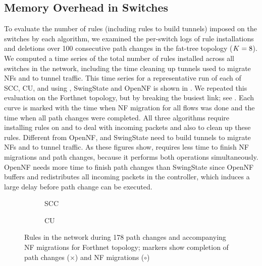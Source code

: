 \subsection{Memory Overhead in Switches}


To evaluate the number of rules (including rules to build tunnels)
imposed on the switches by each algorithm, we examined the per-switch
logs of rule installations and deletions over 100 consecutive path
changes in the fat-tree topology ($K = 8$). We computed
a time series of the total number of rules installed across all
switches in the network, including the time cleaning up tunnels used
to migrate NFs and to tunnel traffic. This time series for a
representative run of each of SCC, CU, and \ourRouteUpdateName using
\sysname, SwingState and OpenNF is shown in
.  We repeated this evaluation on the
Forthnet topology, but by breaking the busiest link; see
.  Each curve is marked with the time
when NF migration for all flows was done and the time when all path
changes were completed.  All three algorithms require installing rules
on \oldSwitchID{\nfIdx} and \newSwitchID{\nfIdx} to deal with incoming
packets and also to clean up these rules.  Different from OpenNF,
\sysname and SwingState need to build tunnels to migrate NFs and to
tunnel traffic.  As these figures show, \sysname requires less time to
finish NF migrations and path changes, because it performs both
operations simultaneously. OpenNF needs more time to finish path changes
than SwingState since OpenNF buffers and redistributes all incoming packets in the controller,
which induces a large delay before path change can be executed.


\begin{figure}[H]
\centering
   \begin{subfigure}[b]{0.69\linewidth}
    \resizebox{\textwidth}{!}{\footnotesize{}}
    \caption{SCC}
    \label{fig:rule_number:Forthnet:scc}
  \end{subfigure}
  \par\bigskip
  \begin{subfigure}[b]{0.69\linewidth}
    \resizebox{\textwidth}{!}{\footnotesize{}}
    \caption{CU}
    \label{fig:rule_number:Forthnet:scc}
  \end{subfigure}
  \par\bigskip
  \begin{subfigure}[b]{0.69\linewidth}
    \resizebox{\textwidth}{!}{\small{}}
    \caption{\ourRouteUpdateName}
    \label{fig:rule_number:Forthnet:cu}
  \end{subfigure}
  \caption{Rules in the network during 178 path changes and
    accompanying NF migrations for Forthnet topology; markers show
    completion of path changes ($\times$) and NF migrations
    ({\LARGE $\circ$})}
\label{fig:rule_number:Forthnet}
\end{figure}



